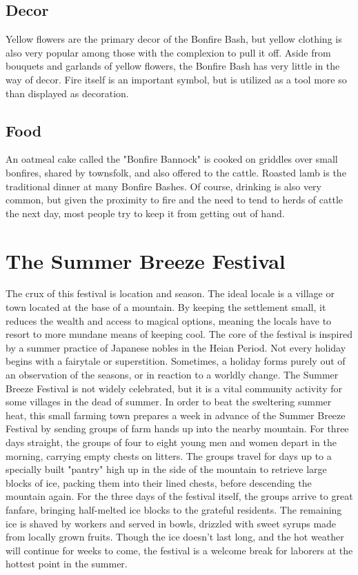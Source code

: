 \documentclass[10pt,a4paper,twoside,twocolumn,openany,bg=print,nodeprecatedcode]{dndbook}
\begin{document}
\subsection{Decor}
Yellow flowers are the primary decor of the Bonfire Bash, but yellow clothing is also very popular among those with the complexion to pull it off. Aside from bouquets and garlands of yellow flowers, the Bonfire Bash has very little in the way of decor. Fire itself is an important symbol, but is utilized as a tool more so than displayed as decoration.
\subsection{Food}
An oatmeal cake called the "Bonfire Bannock" is cooked on griddles over small bonfires, shared by townsfolk, and also offered to the cattle. Roasted lamb is the traditional dinner at many Bonfire Bashes. Of course, drinking is also very common, but given the proximity to fire and the need to tend to herds of cattle the next day, most people try to keep it from getting out of hand.
\section{The Summer Breeze Festival}
The crux of this festival is location and season. The ideal locale is a village or town located at the base of a mountain. By keeping the settlement small, it reduces the wealth and access to magical options, meaning the locals have to resort to more mundane means of keeping cool. The core of the festival is inspired by a summer practice of Japanese nobles in the Heian Period.
Not every holiday begins with a fairytale or superstition. Sometimes, a holiday forms purely out of an observation of the seasons, or in reaction to a worldly change. The Summer Breeze Festival is not widely celebrated, but it is a vital community activity for some villages in the dead of summer. In order to beat the sweltering summer heat, this small farming town prepares a week in advance of the Summer Breeze Festival by sending groups of farm hands up into the nearby mountain. For three days straight, the groups of four to eight young men and women depart in the morning, carrying empty chests on litters. The groups travel for days up to a specially built "pantry" high up in the side of the mountain to retrieve large blocks of ice, packing them into their lined chests, before descending the mountain again.
For the three days of the festival itself, the groups arrive to great fanfare, bringing half-melted ice blocks to the grateful residents. The remaining ice is shaved by workers and served in bowls, drizzled with sweet syrups made from locally grown fruits. Though the ice doesn't last long, and the hot weather will continue for weeks to come, the festival is a welcome break for laborers at the hottest point in the summer.
\end{document}
